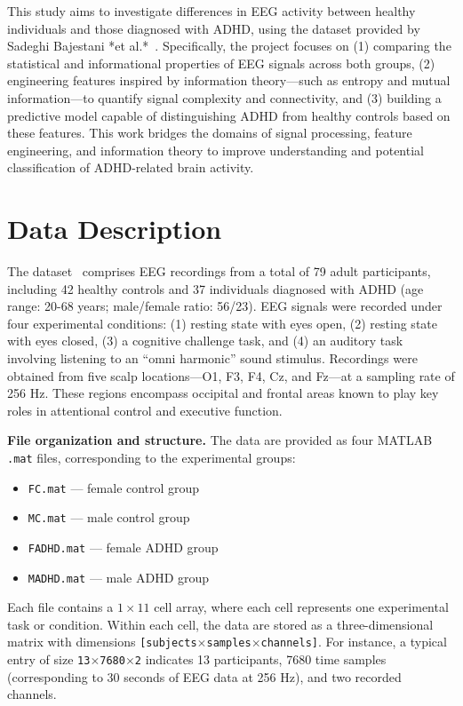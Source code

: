 \documentclass[11pt,a4paper]{article}
\begin{document}
This study aims to investigate differences in EEG activity between healthy individuals and those diagnosed with ADHD, using the dataset 
provided by Sadeghi Bajestani *et al.*~\cite{dataset}. Specifically, the project focuses on (1) comparing the statistical and informational 
properties of EEG signals across both groups, (2) engineering features inspired by information theory—such as entropy and mutual information—to 
quantify signal complexity and connectivity, and (3) building a predictive model capable of distinguishing ADHD from healthy controls based on 
these features. This work bridges the domains of signal processing, feature engineering, and information theory to improve understanding and 
potential classification of ADHD-related brain activity.


\section{Data Description}\label{sec:Dataset}
The dataset~\cite{dataset} comprises EEG recordings from a total of 79 adult participants, including 42 healthy controls and 37 individuals 
diagnosed with ADHD (age range: 20-68 years; male/female ratio: 56/23). EEG signals were recorded under four experimental conditions: 
(1) resting state with eyes open, (2) resting state with eyes closed, (3) a cognitive challenge task, and (4) an auditory task involving 
listening to an ``omni harmonic'' sound stimulus. Recordings were obtained from five scalp locations—O1, F3, F4, Cz, and Fz—at a sampling rate 
of 256 Hz. These regions encompass occipital and frontal areas known to play key roles in attentional control and executive function.

\vspace{0.3cm}
\noindent\textbf{File organization and structure.}  
The data are provided as four MATLAB \texttt{.mat} files, corresponding to the experimental groups:
\begin{itemize}
    \item \texttt{FC.mat} — female control group  
    \item \texttt{MC.mat} — male control group  
    \item \texttt{FADHD.mat} — female ADHD group  
    \item \texttt{MADHD.mat} — male ADHD group
\end{itemize}

Each file contains a $1\times11$ cell array, where each cell represents one experimental task or condition. Within each cell, the data are 
stored as a three-dimensional matrix with dimensions \texttt{[subjects$\times$samples$\times$channels]}. For instance, a typical entry of size 
\texttt{13$\times$7680$\times$2} indicates 13 participants, 7680 time samples (corresponding to 30 seconds of EEG data at 256 Hz), and two 
recorded channels.
\end{document}
